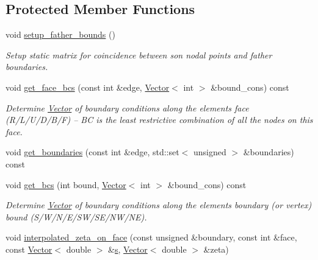 \subsection*{Protected Member Functions}
\begin{DoxyCompactItemize}
\item 
void \hyperlink{classoomph_1_1RefineableQElement_3_013_01_4_a8e9be85046f3898ece0a328512392ca8}{setup\+\_\+father\+\_\+bounds} ()
\begin{DoxyCompactList}\small\item\em Setup static matrix for coincidence between son nodal points and father boundaries. \end{DoxyCompactList}\item 
void \hyperlink{classoomph_1_1RefineableQElement_3_013_01_4_ab7548543df38dcc3a011d51c6ed357ac}{get\+\_\+face\+\_\+bcs} (const int \&edge, \hyperlink{classoomph_1_1Vector}{Vector}$<$ int $>$ \&bound\+\_\+cons) const
\begin{DoxyCompactList}\small\item\em Determine \hyperlink{classoomph_1_1Vector}{Vector} of boundary conditions along the element\textquotesingle{}s face (R/\+L/\+U/\+D/\+B/F) -- BC is the least restrictive combination of all the nodes on this face. \end{DoxyCompactList}\item 
void \hyperlink{classoomph_1_1RefineableQElement_3_013_01_4_ac61083ce6abe6338ec5d7795d9f1e051}{get\+\_\+boundaries} (const int \&edge, std\+::set$<$ unsigned $>$ \&boundaries) const
\item 
void \hyperlink{classoomph_1_1RefineableQElement_3_013_01_4_aac2601ff8f740680675e5e6ba5c35e9d}{get\+\_\+bcs} (int bound, \hyperlink{classoomph_1_1Vector}{Vector}$<$ int $>$ \&bound\+\_\+cons) const
\begin{DoxyCompactList}\small\item\em Determine \hyperlink{classoomph_1_1Vector}{Vector} of boundary conditions along the element\textquotesingle{}s boundary (or vertex) bound (S/\+W/\+N/\+E/\+S\+W/\+S\+E/\+N\+W/\+NE). \end{DoxyCompactList}\item 
void \hyperlink{classoomph_1_1RefineableQElement_3_013_01_4_aa0feadb4fbbe8861366a77373b122293}{interpolated\+\_\+zeta\+\_\+on\+\_\+face} (const unsigned \&boundary, const int \&face, const \hyperlink{classoomph_1_1Vector}{Vector}$<$ double $>$ \&\hyperlink{cfortran_8h_ab7123126e4885ef647dd9c6e3807a21c}{s}, \hyperlink{classoomph_1_1Vector}{Vector}$<$ double $>$ \&zeta)

\end{DoxyCompactItemize}
